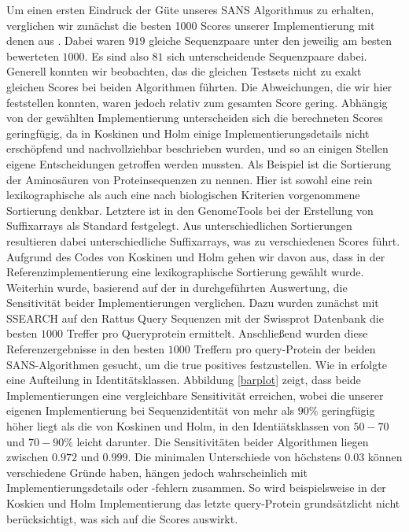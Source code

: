 \documentclass{article}
\begin{document}
Um einen ersten Eindruck der Güte unseres SANS Algorithmus zu erhalten, verglichen wir zunächst die besten 1000 Scores unserer Implementierung
mit denen aus \cite{Holm}. Dabei waren $919$ gleiche Sequenzpaare unter den jeweilig am besten bewerteten $1000$. Es sind also $81$ sich unterscheidende 
Sequenzpaare dabei. Generell konnten wir beobachten, das die gleichen Testsets nicht zu exakt gleichen Scores bei beiden Algorithmen führten. Die
Abweichungen, die wir hier feststellen konnten, waren jedoch relativ zum gesamten Score gering.
Abhängig von der gewählten Implementierung unterscheiden sich die berechneten Scores geringfügig,  da in Koskinen und Holm  \cite{Holm} einige Implementierungsdetails nicht erschöpfend und nachvollziehbar beschrieben wurden,
und so an einigen Stellen eigene Entscheidungen getroffen werden mussten. Als Beispiel ist die Sortierung der Aminosäuren von Proteinsequenzen
zu nennen. Hier ist sowohl eine rein lexikographische als auch eine nach biologischen Kriterien vorgenommene Sortierung denkbar. Letztere ist in den GenomeTools \cite{gtools} bei der Erstellung von Suffixarrays als Standard festgelegt. 
Aus unterschiedlichen
Sortierungen resultieren dabei unterschiedliche Suffixarrays, was zu verschiedenen Scores führt. 
Aufgrund des Codes von Koskinen und Holm gehen wir davon aus, dass in der Referenzimplementierung eine lexikographische Sortierung gewählt wurde.
Weiterhin wurde, basierend auf der in \cite{Holm} durchgeführten Auswertung, die Sensitivität beider Implementierungen verglichen. Dazu wurden zunächst mit SSEARCH auf den Rattus Query
Sequenzen mit der Swissprot Datenbank die besten $1000$ Treffer pro Queryprotein ermittelt. 
Anschließend wurden diese Referenzergebnisse in den besten $1000$ Treffern pro query-Protein der beiden SANS-Algorithmen gesucht, um die true positives festzustellen. 
Wie in \cite{Holm} erfolgte eine Aufteilung in Identitätsklassen. Abbildung \ref{barplot} zeigt, dass beide Implementierungen eine vergleichbare Sensitivität erreichen, wobei die
unserer eigenen Implementierung bei Sequenzidentität von mehr als $90\%$ geringfügig höher liegt als die von Koskinen und Holm, in den Identiätsklassen von $50-70$ und $70-90\%$ leicht darunter. 
Die Sensitivitäten beider Algorithmen liegen zwischen $0.972$ und $0.999$.
Die minimalen Unterschiede von höchstens $0.03$ können verschiedene Gründe haben, hängen jedoch wahrscheinlich mit Implementierungsdetails
oder -fehlern zusammen. So wird beispielsweise in der Koskien und Holm Implementierung das letzte query-Protein grundsätzlicht nicht berücksichtigt, was sich auf die Scores auswirkt.
\end{document}
